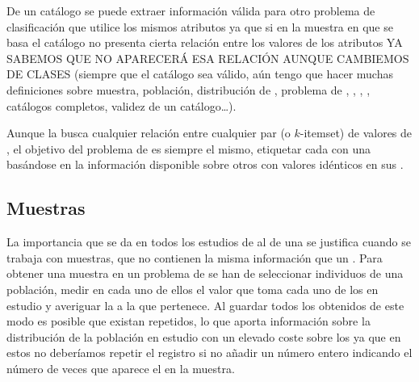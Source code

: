 De un catálogo se puede extraer información válida para otro problema de clasificación que utilice los mismos atributos ya que si en la muestra en que se basa el catálogo no presenta cierta relación entre los valores de los atributos YA SABEMOS QUE NO APARECERÁ ESA RELACIÓN AUNQUE CAMBIEMOS DE CLASES (siempre que el catálogo sea válido, aún tengo que hacer muchas definiciones sobre muestra, población, distribución de \clases, problema de \clasificacion, \atributos, \clases, \catalogos, catálogos completos, validez de un catálogo\ldots).

Aunque la \ARM busca cualquier relación entre cualquier par (o $k$-itemset) de valores de \D, el objetivo del problema de \clasificacion es siempre el mismo, etiquetar cada \registro con una \clase basándose en la información disponible sobre otros \registros con valores idénticos en sus \atributos.





\subsection{Muestras}
\label{sec:clasificacion:catalogo:muestras}
La importancia que se da en todos los estudios de \ARM al \soporte de una \ar se justifica cuando se trabaja con muestras, que no contienen la misma información que un \catalogo. Para obtener una muestra en un problema de \clasificacion se han de seleccionar individuos de una población, medir en cada uno de ellos el valor que toma cada uno de los \atributos en estudio y averiguar la \clase a la que pertenece. Al guardar todos los \registros obtenidos de este modo es posible que existan \registros repetidos, lo que aporta información sobre la distribución de la población en estudio con un elevado coste sobre los \catalogos ya que en estos no deberíamos repetir el registro si no añadir un número entero indicando el número de veces que aparece el \registro en la muestra.

